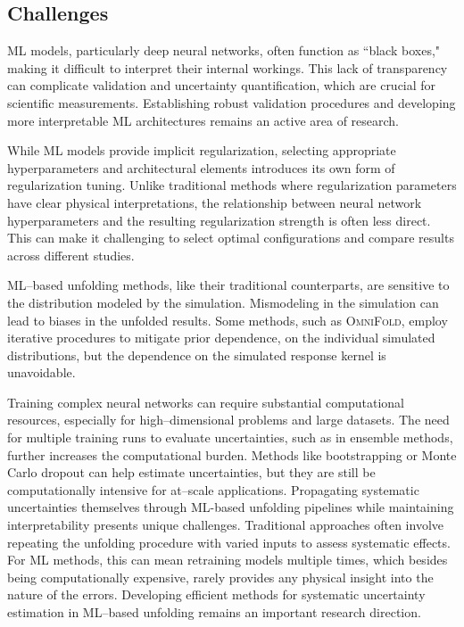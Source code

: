 \subsection{Challenges}
    ML models, particularly deep neural networks, often function as ``black boxes," making it difficult to interpret their internal workings.
    This lack of transparency can complicate validation and uncertainty quantification, which are crucial for scientific measurements.
    Establishing robust validation procedures and developing more interpretable ML architectures remains an active area of research.

    While ML models provide implicit regularization, selecting appropriate hyperparameters and architectural elements introduces its own form of regularization tuning.
    Unlike traditional methods where regularization parameters have clear physical interpretations, the relationship between neural network hyperparameters and the resulting regularization strength is often less direct.
    This can make it challenging to select optimal configurations and compare results across different studies.

    ML--based unfolding methods, like their traditional counterparts, are sensitive to the distribution modeled by the simulation.
    Mismodeling in the simulation can lead to biases in the unfolded results.
    Some methods, such as \textsc{OmniFold}, employ iterative procedures to mitigate prior dependence, on the individual simulated distributions, but the dependence on the simulated response kernel is unavoidable.
    
    Training complex neural networks can require substantial computational resources, especially for high--dimensional problems and large datasets.
    The need for multiple training runs to evaluate uncertainties, such as in ensemble methods, further increases the computational burden.
    Methods like bootstrapping or Monte Carlo dropout can help estimate uncertainties, but they are still be computationally intensive for at--scale applications.
    Propagating systematic uncertainties themselves through ML-based unfolding pipelines while maintaining interpretability presents unique challenges.
    Traditional approaches often involve repeating the unfolding procedure with varied inputs to assess systematic effects.
    For ML methods, this can mean retraining models multiple times, which besides being computationally expensive, rarely provides any physical insight into the nature of the errors.
    Developing efficient methods for systematic uncertainty estimation in ML--based unfolding remains an important research direction.

